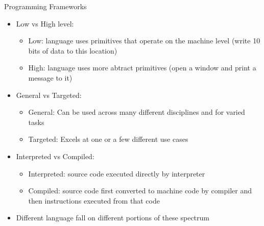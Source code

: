 \documentclass[pdf, aspectratio=169, 12pt]{beamer}
\begin{document}
\begin{frame}{Programming Frameworks}
	\vspace{5mm}
	\begin{itemize}
		\item<1-> \alert{Low vs High level}:
			\begin{itemize}
				\item Low: language uses primitives that operate on the machine level (write 10 bits of data to this location)
				\item High: language uses more abtract primitives (open a window and print a message to it)
			\end{itemize}
		\item<2-> \alert{General vs Targeted}:
			\begin{itemize}
				\item General: Can be used across many different disciplines and for varied tasks
				\item Targeted: Excels at one or a few different use cases
			\end{itemize}
		\item<3-> \alert{Interpreted vs Compiled}:
			\begin{itemize}
				\item Interpreted: source code executed directly by interpreter
				\item Compiled: source code first converted to machine code by compiler and then instructions executed from that code
			\end{itemize}
		\item<4-> Different language fall on different portions of these spectrum
	\end{itemize}
\end{frame}
\end{document}
